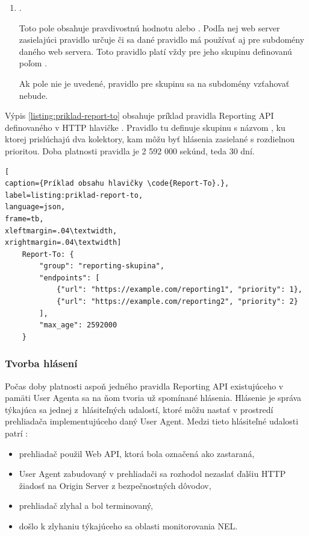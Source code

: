 \begin{enumerate}
    \pagebreak
    
    \item {}.

    Toto pole obsahuje pravdivostnú hodnotu  alebo .
    Podľa nej web server zasielajúci pravidlo určuje či sa dané pravidlo má používať aj pre subdomény daného web servera.
    Toto pravidlo platí vždy pre jeho skupinu definovanú poľom .

    Ak pole nie je uvedené, pravidlo pre skupinu  sa na subdomény vzťahovať nebude.
    
\end{enumerate}

Výpis \ref{listing:priklad-report-to} obsahuje príklad pravidla Reporting API definovaného v HTTP hlavičke . 
Pravidlo tu definuje skupinu s názvom , ku ktorej prislúchajú dva kolektory, kam môžu byť hlásenia zasielané s rozdielnou prioritou. 
Doba platnosti pravidla je 2 592 000 sekúnd, teda 30 dní.

\begin{center}
\centering
\begin{lstlisting}[
caption={Príklad obsahu hlavičky \code{Report-To}.},
label=listing:priklad-report-to, 
language=json, 
frame=tb,
xleftmargin=.04\textwidth, 
xrightmargin=.04\textwidth]
    Report-To: {
        "group": "reporting-skupina",
        "endpoints": [
            {"url": "https://example.com/reporting1", "priority": 1},
            {"url": "https://example.com/reporting2", "priority": 2}
        ],
        "max_age": 2592000
    }
\end{lstlisting}
\end{center}


\subsubsection{Tvorba hlásení}

Počas doby platnosti aspoň jedného pravidla Reporting API existujúceho v pamäti 
User Agenta sa na ňom tvoria už spomínané hlásenia.
Hlásenie je správa týkajúca sa jednej \mbox{z hlásiteľných} udalostí, ktoré môžu nastať v prostredí prehliadača implementujúceho daný User Agent.
Medzi tieto hlásiteľné udalosti patrí \cite{W3C-reporting-api}: 
\begin{itemize}
    \item prehliadač použil Web API, ktorá bola označená ako zastaraná,
    \item User Agent zabudovaný v prehliadači sa rozhodol nezaslať ďalšiu HTTP žiadosť na Origin Server z bezpečnostných dôvodov,
    \item prehliadač zlyhal a bol terminovaný,
    \item došlo k zlyhaniu týkajúceho sa oblasti monitorovania NEL.
\end{itemize}


